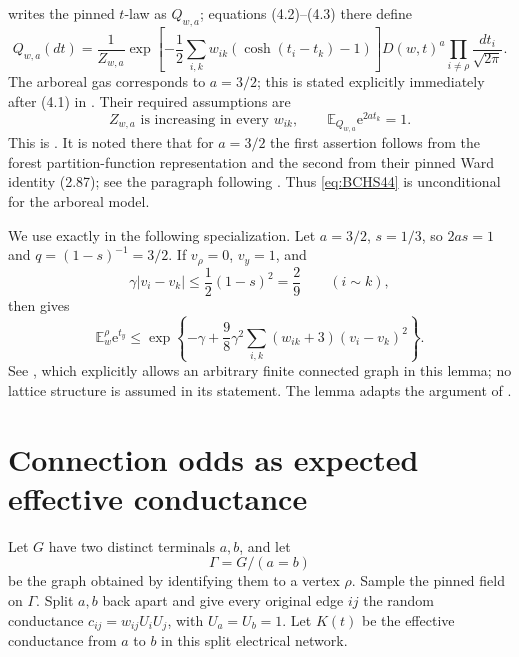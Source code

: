 \documentclass[11pt]{article}
\theoremstyle{definition}
\theoremstyle{remark}
\newcommand{\EE}{\mathbb E}
\newcommand{\1}{\mathbf 1}
\newcommand{\e}{\mathrm e}
\begin{document}
\cite[Section~4.1]{BCHS} writes the pinned $t$-law as $Q_{w,a}$; equations
(4.2)--(4.3) there define
\begin{equation}\label{eq:Qwa}
 Q_{w,a}(dt)=\frac1{Z_{w,a}}
 \exp\left[-\frac12\sum_{i,k}w_{ik}(\cosh(t_i-t_k)-1)\right]
 D(w,t)^a\prod_{i\neq\rho}\frac{dt_i}{\sqrt{2\pi}}.
\end{equation}
The arboreal gas corresponds to $a=3/2$; this is stated explicitly immediately after
(4.1) in \cite[(4.1)--(4.3)]{BCHS}.  Their required assumptions are
\begin{equation}\label{eq:BCHS44}
 Z_{w,a}\text{ is increasing in every }w_{ik},
 \qquad
 \EE_{Q_{w,a}}\e^{2at_k}=1.
\end{equation}
This is \cite[(4.4)]{BCHS}.  It is noted there that for $a=3/2$ the first assertion follows from the
forest partition-function representation and the second from their pinned Ward
identity (2.87); see the paragraph following
\cite[(4.4)]{BCHS}.  Thus \eqref{eq:BCHS44} is unconditional for the arboreal model.

We use \cite[Lemma~4.1]{BCHS} exactly in the following specialization.  Let $a=3/2$,
$s=1/3$, so $2as=1$ and $q=(1-s)^{-1}=3/2$.  If $v_\rho=0$, $v_y=1$, and
\begin{equation}\label{eq:BCHS-gradient-condition}
 \gamma|v_i-v_k|\le \frac12(1-s)^2=\frac29
 \qquad(i\sim k),
\end{equation}
then \cite[Lemma~4.1, (4.6)]{BCHS} gives
\begin{equation}\label{eq:BCHS-specialized}
 \EE^\rho_w\e^{t_y}
 \le
 \exp\left\{-\gamma
 +\frac98\gamma^2
 \sum_{i,k}(w_{ik}+3)(v_i-v_k)^2\right\}.
\end{equation}
See \cite[Lemma~4.1, (4.5)--(4.6)]{BCHS}, which explicitly allows an arbitrary finite
connected graph in this lemma; no lattice structure is assumed in its statement.  The lemma adapts the argument of \cite[Lemma~1]{Sabot}.

\section{Connection odds as expected effective conductance}\label{sec:conductance}

Let $G$ have two distinct terminals $a,b$, and let
\begin{equation}
 \Gamma=G/(a=b)
\end{equation}
be the graph obtained by identifying them to a vertex $\rho$.  Sample the pinned field
on $\Gamma$.  Split $a,b$ back apart and give every original edge $ij$ the random
conductance $c_{ij}=w_{ij}U_iU_j$, with $U_a=U_b=1$.  Let $K(t)$ be the effective
conductance from $a$ to $b$ in this split electrical network.
\end{document}
